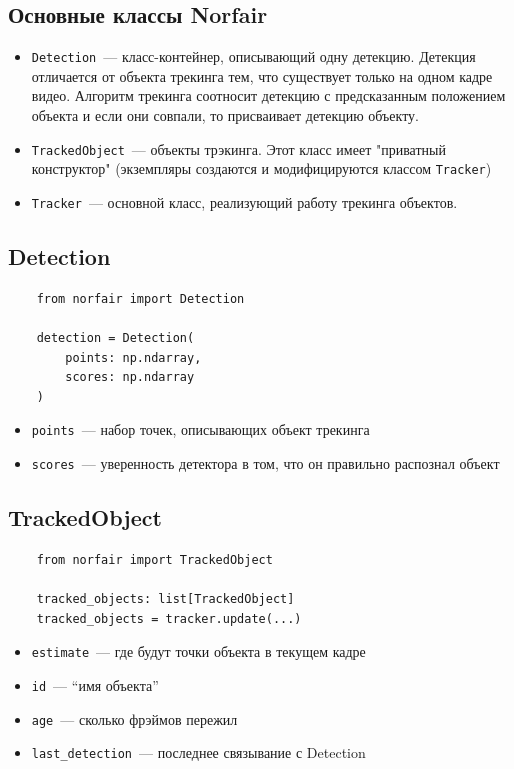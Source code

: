 \subsection{Основные классы Norfair}

\begin{itemize}
    \item \texttt{Detection}~--- класс-контейнер, описывающий одну детекцию. Детекция отличается от объекта трекинга тем, что существует только на одном кадре видео. Алгоритм трекинга соотносит детекцию с предсказанным положением объекта и если они совпали, то присваивает детекцию объекту.
    \item \texttt{TrackedObject}~--- объекты трэкинга. Этот класс имеет "приватный конструктор" (экземпляры создаются и модифицируются классом \texttt{Tracker})
    \item \texttt{Tracker}~--- основной класс, реализующий работу трекинга объектов.
\end{itemize}

\subsection{Detection}
\scriptsize
\begin{verbatim}
    from norfair import Detection

    detection = Detection(
        points: np.ndarray,
        scores: np.ndarray
    )
        \end{verbatim}

\begin{itemize}
    \item \texttt{points}~--- набор точек, описывающих объект трекинга
    \item \texttt{scores}~--- уверенность детектора в том, что он правильно распознал объект
\end{itemize}

\subsection{TrackedObject}
\scriptsize
\begin{verbatim}
    from norfair import TrackedObject
    
    tracked_objects: list[TrackedObject]
    tracked_objects = tracker.update(...)
        \end{verbatim}

\begin{itemize}
    \item \texttt{estimate}~--- где будут точки объекта в текущем кадре
    \item \texttt{id}~--- \enquote{имя объекта}
    \item \texttt{age}~--- сколько фрэймов пережил
    \item \texttt{last\_detection}~--- последнее связывание с Detection
\end{itemize}

